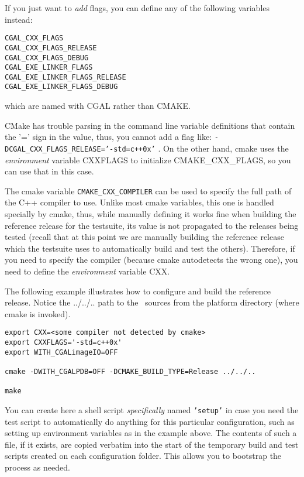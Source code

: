 If you just want to {\em add} flags, you can define any of the following variables instead:

\begin{verbatim}
CGAL_CXX_FLAGS
CGAL_CXX_FLAGS_RELEASE
CGAL_CXX_FLAGS_DEBUG
CGAL_EXE_LINKER_FLAGS
CGAL_EXE_LINKER_FLAGS_RELEASE
CGAL_EXE_LINKER_FLAGS_DEBUG
\end{verbatim}

which are named with CGAL rather than CMAKE.

CMake has trouble parsing in the command line variable definitions that contain the '=' sign in the value, thus,
you cannot add a flag like: {\tt -DCGAL\_CXX\_FLAGS\_RELEASE='-std=c++0x'} . On the other hand, cmake uses
the {\em environment} variable CXXFLAGS to initialize CMAKE\_CXX\_FLAGS, so you can use that in this case.

The cmake variable {\tt CMAKE\_CXX\_COMPILER} can be used to specify the full path of the C++ compiler to use.
Unlike most cmake variables, this one is handled specially by cmake, thus, while manually defining it
works fine when building the reference release for the testsuite, its value is not propagated
to the releases being tested (recall that at this point we are manually building the reference release
which the testsuite uses to automatically build and test the others). Therefore, if you need
to specify the compiler (because cmake autodetects the wrong one), you need to define the
{\em environment} variable CXX.


The following example illustrates how to configure and build the reference release.
Notice the ../../.. path to the \cgal\ sources from the platform directory (where cmake is invoked).

\begin{verbatim}
export CXX=<some compiler not detected by cmake>
export CXXFLAGS='-std=c++0x'
export WITH_CGALimageIO=OFF 

cmake -DWITH_CGALPDB=OFF -DCMAKE_BUILD_TYPE=Release ../../..

make
\end{verbatim}

You can create here a shell script {\em specifically} named {\tt 'setup'} in case you need the test script
to automatically do anything for this particular configuration, such as setting up 
environment variables as in the example above. The contents of such a file, if it exists, are copied verbatim 
into the start of the temporary build and test scripts created on each configuration folder. This allows
you to bootstrap the process as needed.

